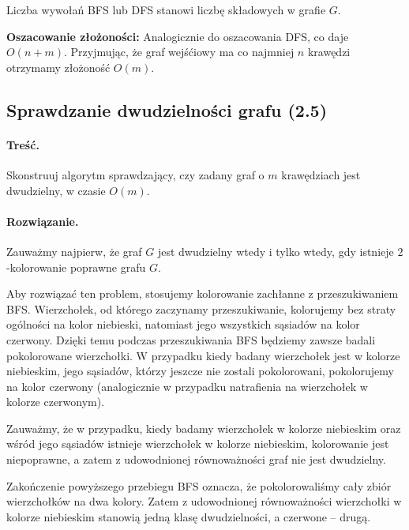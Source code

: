 Liczba wywołań BFS lub DFS stanowi liczbę składowych w grafie $G$.

\textbf{Oszacowanie złożoności:} Analogicznie do oszacowania DFS, co daje $O(n + m)$. Przyjmując, że
graf wejśćiowy ma co najmniej $n$ krawędzi otrzymamy złożoność  $O(m)$.

\subsection{Sprawdzanie dwudzielności grafu (2.5)}
\label{exc:bipart}
\paragraph{Treść.} Skonstruuj algorytm sprawdzający, 
czy zadany graf o $m$ krawędziach jest dwudzielny, w czasie $O(m)$.

\paragraph{Rozwiązanie.} Zauważmy najpierw, że 
graf $G$ jest dwudzielny wtedy i tylko wtedy, gdy istnieje $2$-kolorowanie
poprawne grafu $G$.  

Aby rozwiązać ten problem, stosujemy kolorowanie 
zachłanne z przeszukiwaniem BFS. 
Wierzchołek, od którego zaczynamy przeszukiwanie, kolorujemy bez straty
ogólności na kolor niebieski, natomiast jego wszystkich sąsiadów na kolor czerwony.
Dzięki temu podczas przeszukiwania BFS będziemy zawsze badali pokolorowane 
wierzchołki. W przypadku kiedy badany wierzchołek jest w kolorze niebieskim, jego 
sąsiadów, którzy jeszcze nie zostali pokolorowani, pokolorujemy na kolor czerwony (analogicznie
w przypadku natrafienia na wierzchołek w kolorze czerwonym).

Zauważmy, że w przypadku, kiedy badamy wierzchołek w kolorze niebieskim oraz wśród jego sąsiadów
istnieje wierzchołek w kolorze niebieskim, kolorowanie jest niepoprawne, a zatem z udowodnionej 
równoważności graf nie jest dwudzielny.

Zakończenie powyższego przebiegu BFS oznacza, że pokolorowaliśmy cały zbiór wierzchołków na
dwa kolory. Zatem z udowodnionej równoważności
wierzchołki w kolorze niebieskim stanowią jedną klasę dwudzielności, a czerwone -- drugą.


